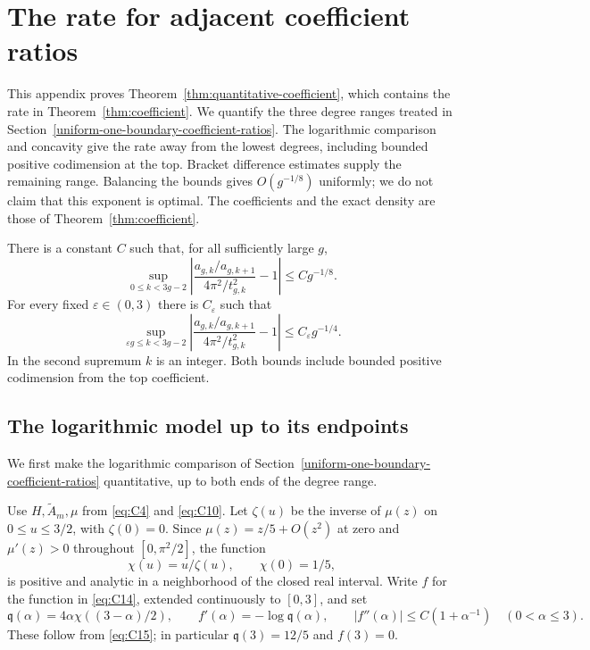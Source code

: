 \section{The rate for adjacent coefficient ratios}
\label{sec:quantitative-coefficients}

This appendix proves Theorem~\ref{thm:quantitative-coefficient}, which
contains the rate in Theorem~\ref{thm:coefficient}. We quantify the three
degree ranges treated in Section~\ref{uniform-one-boundary-coefficient-ratios}.
The logarithmic comparison and concavity give the rate away from the
lowest degrees, including bounded positive codimension at the top.
Bracket difference estimates supply the remaining range. Balancing the
bounds gives $O(g^{-1/8})$ uniformly; we do not claim that this exponent
is optimal. The coefficients and the exact density are those of
Theorem~\ref{thm:coefficient}.

\begin{theorem}\label{thm:quantitative-coefficient}
There is a constant $C$ such that, for all sufficiently large $g$,
\begin{equation}
 \sup_{0\le k<3g-2}
 \left|\frac{a_{g,k}/a_{g,k+1}}{4\pi^2/t_{g,k}^2}-1\right|
 \le Cg^{-1/8}.
 \label{eq:QC1}
\end{equation}
For every fixed $\varepsilon\in(0,3)$ there is $C_\varepsilon$ such that
\begin{equation}
 \sup_{\varepsilon g\le k<3g-2}
 \left|\frac{a_{g,k}/a_{g,k+1}}{4\pi^2/t_{g,k}^2}-1\right|
 \le C_\varepsilon g^{-1/4}.
 \label{eq:QC2}
\end{equation}
In the second supremum $k$ is an integer. Both bounds include bounded
positive codimension from the top coefficient.
\end{theorem}

\subsection{The logarithmic model up to its endpoints}

We first make the logarithmic comparison of
Section~\ref{uniform-one-boundary-coefficient-ratios} quantitative, up to
both ends of the degree range.

Use $H,\widetilde A_m,\mu$ from \eqref{eq:C4} and \eqref{eq:C10}.
Let $\zeta(u)$ be the inverse of $\mu(z)$ on $0\le u\le3/2$,
with $\zeta(0)=0$. Since $\mu(z)=z/5+O(z^2)$ at zero and
$\mu'(z)>0$ throughout $[0,\pi^2/2]$, the function
\[
 \chi(u)=u/\zeta(u),\qquad \chi(0)=1/5,
\]
is positive and analytic in a neighborhood of the closed real interval.
Write $f$ for the function in \eqref{eq:C14}, extended continuously to
$[0,3]$, and set
\begin{equation}
 \mathfrak q(\alpha)=4\alpha\chi((3-\alpha)/2),\qquad
 f'(\alpha)=-\log\mathfrak q(\alpha),\qquad
 |f''(\alpha)|\le C(1+\alpha^{-1})\quad(0<\alpha\le3).
 \label{eq:QC3}
\end{equation}
These follow from \eqref{eq:C15}; in particular
$\mathfrak q(3)=12/5$ and $f(3)=0$.

